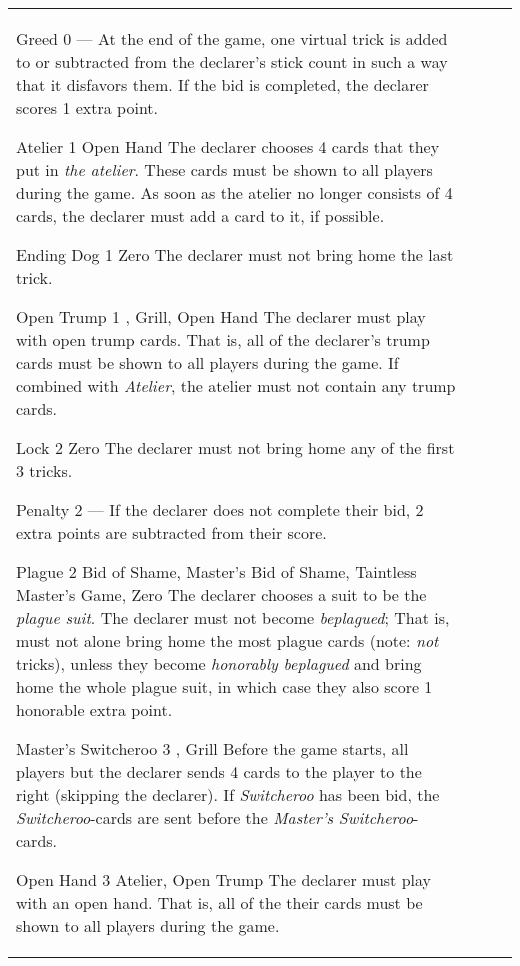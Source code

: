 \begin{table}
\begin{center}
\begin{tabularx}{\textwidth}{
			l
			S[table-number-alignment=center, table-figures-decimal=0]
			p{3cm}
			|X
		}
			\specialBidItem%
			{Greed}
			{0}
			{---}
			{%
				At the end of the game, one virtual trick is added to or subtracted from the declarer's stick count in such a way that it disfavors them. If the bid is completed, the declarer scores 1 extra point.
			}

			\specialBidItem%
			{Atelier}
			{1}
			{Open Hand}
			{%
				The declarer chooses 4 cards that they put in \emph{the atelier}. These cards must be shown to all players during the game. As soon as the atelier no longer consists of 4 cards, the declarer must add a card to it, if possible.
			}

			\specialBidItem%
			{Ending Dog}
			{1}
			{Zero}
			{%
				The declarer must not bring home the last trick.
			}

			\specialBidItem%
			{Open Trump}
			{1}
			{\nonTrump, Grill, Open Hand}
			{%
				The declarer must play with open trump cards. That is, all of the declarer’s trump cards must be shown to all players during the game. If combined with \emph{Atelier}, the atelier must not contain any trump cards.
			}

			\specialBidItem%
			{Lock}
			{2}
			{Zero}
			{%
				The declarer must not bring home any of the first 3 tricks.
			}

			\specialBidItem%
			{Penalty}
			{2}
			{---}
			{%
				If the declarer does not complete their bid, 2 extra points are subtracted from their score.
			}

			\specialBidItem%
			{Plague}
			{2}
			{Bid of Shame, Master's Bid of Shame, Taintless Master's Game, Zero}
			{%
				The declarer chooses a suit to be the \emph{plague suit}. The declarer must not become \emph{beplagued}; That is, must not alone bring home the most plague cards (note: \emph{not} tricks), unless they become \emph{honorably beplagued} and bring home the whole plague suit, in which case they also score 1 honorable extra point.
			}

			\specialBidItem%
			{Master's Switcheroo}
			{3}
			{\nonTrump, Grill}
			{%
				Before the game starts, all players but the declarer sends 4 cards to the player to the right (skipping the declarer). If \emph{Switcheroo} has been bid, the \emph{Switcheroo}-cards are sent before the \emph{Master's Switcheroo}-cards.
			}

			\specialBidItem%
			{Open Hand}
			{3}
			{Atelier, Open Trump}
			{%
				The declarer must play with an open hand. That is, all of the their cards must be shown to all players during the game.
			}
		\end{tabularx}
	\end{center}
\end{table}
